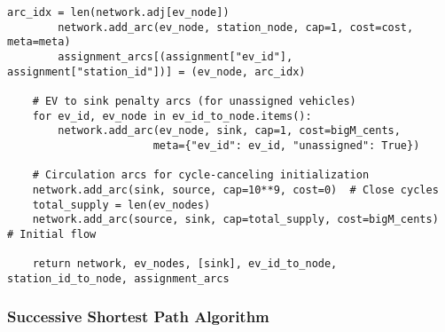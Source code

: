 \documentclass[12pt,a4paper]{article}
\begin{document}
\begin{lstlisting}[caption=Bipartite Network Construction]
        arc_idx = len(network.adj[ev_node])
        network.add_arc(ev_node, station_node, cap=1, cost=cost, meta=meta)
        assignment_arcs[(assignment["ev_id"], assignment["station_id"])] = (ev_node, arc_idx)
    
    # EV to sink penalty arcs (for unassigned vehicles)
    for ev_id, ev_node in ev_id_to_node.items():
        network.add_arc(ev_node, sink, cap=1, cost=bigM_cents, 
                       meta={"ev_id": ev_id, "unassigned": True})
    
    # Circulation arcs for cycle-canceling initialization
    network.add_arc(sink, source, cap=10**9, cost=0)  # Close cycles
    total_supply = len(ev_nodes)
    network.add_arc(source, sink, cap=total_supply, cost=bigM_cents)  # Initial flow
    
    return network, ev_nodes, [sink], ev_id_to_node, station_id_to_node, assignment_arcs
\end{lstlisting}

\subsubsection{Successive Shortest Path Algorithm}
\end{document}
